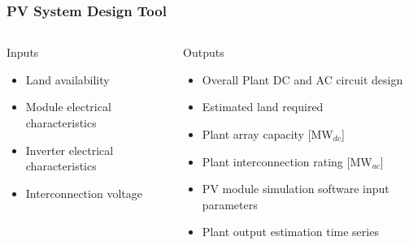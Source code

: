 \documentclass[aspectratio=169]{beamer}
\begin{document}
\begin{frame}
  \frametitle{PV System Design Tool}
  \begin{columns}[t]
    \begin{block}{Inputs}
      \begin{itemize}
      \item Land availability
      \item Module electrical characteristics
      \item Inverter electrical characteristics
      \item Interconnection voltage
      \end{itemize}
    \end{block}

    \begin{block}{Outputs}
      \begin{itemize}
      \item Overall Plant DC and AC circuit design
      \item Estimated land required
      \item Plant array capacity [MW$_{dc}$]
      \item Plant interconnection rating [MW$_{ac}$]
      \item PV module simulation software input parameters
      \item Plant output estimation time series
      \end{itemize}
    \end{block}
  \end{columns}
\end{frame}
\end{document}
